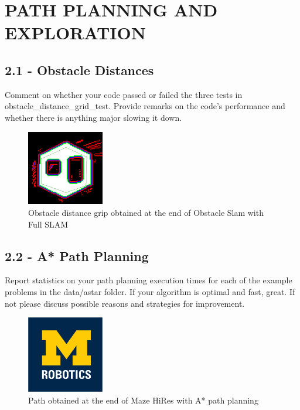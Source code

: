 \documentclass[journal,twocolumn]{IEEEtran}
\begin{document}
\section{PATH PLANNING AND EXPLORATION}

\subsection*{2.1 - Obstacle Distances} 

Comment on whether your code passed or failed the three tests in obstacle\_distance\_grid\_test. Provide remarks on the code’s performance and whether there is anything major slowing it down.

\begin{figure}[H]
\centering
\includegraphics[width=0.3\textwidth]{Media/21.png}
\caption{Obstacle distance grip obtained at the end of Obstacle Slam with Full SLAM}
\end{figure}


\subsection*{2.2 - A* Path Planning} 

Report statistics on your path planning execution times for each of the example problems in the data/astar folder. If your algorithm is optimal and fast, great. If not please discuss possible reasons and strategies for improvement.

\begin{figure}[H]
\centering
\includegraphics[width=0.3\textwidth]{Media/template-robotics.jpg}
\caption{Path obtained at the end of Maze HiRes with A* path planning}
\end{figure}
\end{document}
